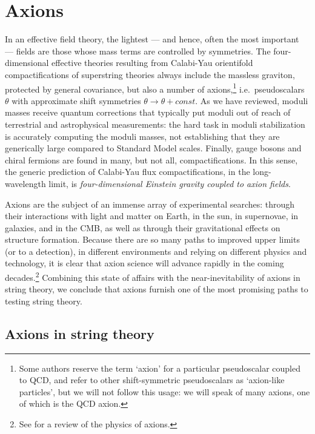 \documentclass[12pt,a4wide]{article}
\begin{document}
\section{Axions}\label{sec:axions}
 
In an effective field theory, the lightest --- and hence, often the most important --- fields are those whose mass terms are controlled by symmetries.  The four-dimensional effective theories resulting from Calabi-Yau orientifold compactifications of superstring theories always include the massless graviton, protected by general covariance, but also a number of axions,\footnote{Some authors reserve the term `axion' for a particular pseudoscalar coupled to QCD, and refer to other shift-symmetric pseudoscalars as `axion-like particles', but we will not follow this usage: we will speak of many axions, one of which is the QCD axion.} i.e.~pseudoscalars $\theta$ with approximate shift symmetries $\theta \to \theta + const$.
As we have reviewed, moduli masses receive quantum corrections that typically put moduli out of reach of terrestrial and astrophysical measurements: the hard task in moduli stabilization is accurately computing the moduli masses, not establishing that they are generically large compared to Standard Model scales. Finally, gauge bosons and chiral fermions are found in many, but not all, compactifications.
In this sense, the generic prediction of Calabi-Yau flux compactifications, in the long-wavelength limit, is \emph{four-dimensional Einstein gravity coupled to axion fields}.    


Axions are the subject of an immense array of experimental searches: through their interactions with light and matter on Earth, in the sun, in supernovae, in galaxies, and in the CMB, as well as through their gravitational effects on structure formation.  Because there are so many paths to improved upper limits (or to a detection), in different environments and relying on different physics and technology, it is clear that axion science will advance rapidly in the coming decades.\footnote{See \cite{Marsh:2015xka} for a review of the physics of axions.}  Combining this state of affairs with the near-inevitability of axions in string theory, we conclude that axions furnish one of the most promising paths to testing string theory.

\subsection{Axions in string theory}\label{sec:axionstring}
\end{document}
